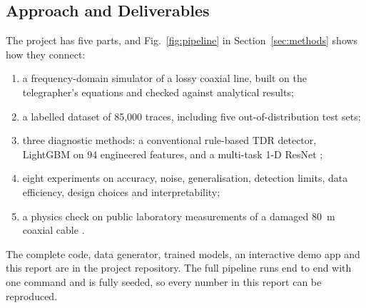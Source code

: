 \subsection{Approach and Deliverables}
The project has five parts, and Fig.~\ref{fig:pipeline} in Section~\ref{sec:methods} shows how they connect:
\begin{enumerate}
    \item a frequency-domain simulator of a lossy coaxial line, built on the telegrapher's equations and checked against analytical results;
    \item a labelled dataset of 85,000 traces, including five out-of-distribution test sets;
    \item three diagnostic methods: a conventional rule-based TDR detector, LightGBM \cite{ke2017lightgbm} on 94 engineered features, and a multi-task 1-D ResNet \cite{he2016deep};
    \item eight experiments on accuracy, noise, generalisation, detection limits, data efficiency, design choices and interpretability;
    \item a physics check on public laboratory measurements of a damaged 80~m coaxial cable \cite{nrel_wise_casing}.
\end{enumerate}
The complete code, data generator, trained models, an interactive demo app and this report are in the project repository. The full pipeline runs end to end with one command and is fully seeded, so every number in this report can be reproduced.
